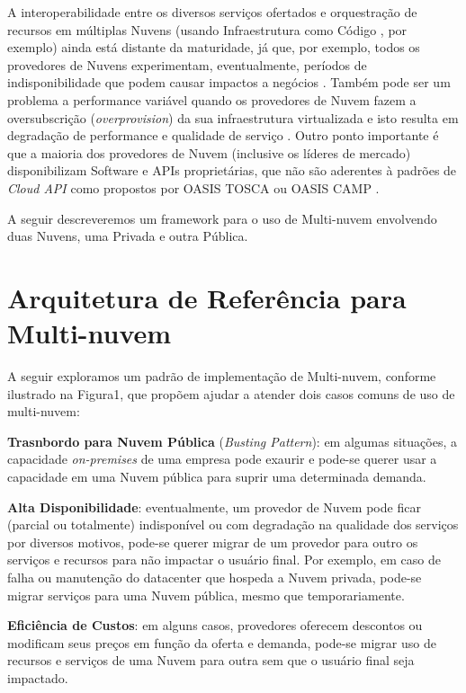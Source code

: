 \documentclass[12pt]{article}
\begin{document}
	A interoperabilidade entre os diversos serviços ofertados e orquestração de recursos em múltiplas Nuvens (usando Infraestrutura como Código \cite{Morris:2016}, por exemplo) ainda está distante da maturidade, já que, por exemplo, todos os provedores de Nuvens experimentam, eventualmente, períodos de indisponibilidade que podem causar impactos a negócios \cite{Fisher:2018}. Também pode ser um problema a performance variável quando os provedores de Nuvem fazem a oversubscrição (\textit{overprovision}) da sua infraestrutura virtualizada e isto resulta em degradação de performance e qualidade de serviço \cite{CloudSpectator:2017}. Outro ponto importante é que a maioria dos provedores de Nuvem  (inclusive os líderes de mercado) disponibilizam Software e APIs proprietárias, que não são aderentes à padrões de \textit{Cloud API} como propostos por OASIS TOSCA \cite{TOSCA:2019} ou OASIS CAMP \cite{CAMP:2019}.
	 
	A seguir descreveremos um framework para o uso de Multi-nuvem envolvendo duas Nuvens, uma Privada e outra Pública. 
	
	\section{Arquitetura de Referência para Multi-nuvem}
	
	A seguir exploramos um padrão de implementação de Multi-nuvem, conforme ilustrado na Figura1, que propõem ajudar a atender dois casos comuns de uso de multi-nuvem:
	
	\textbf{Trasnbordo para Nuvem Pública} (\textit{Busting Pattern}): em algumas situações, a capacidade \textit{on-premises} de uma empresa pode exaurir e pode-se querer usar a capacidade em uma Nuvem pública para suprir uma determinada demanda.
	
	\textbf{Alta Disponibilidade}: eventualmente, um provedor de Nuvem pode ficar (parcial ou totalmente) indisponível ou com degradação na qualidade dos serviços por diversos motivos, pode-se querer migrar de um provedor para outro os serviços e recursos para não impactar o usuário final. Por exemplo, em caso de falha ou manutenção do datacenter que hospeda a Nuvem privada, pode-se migrar serviços para uma Nuvem pública, mesmo que temporariamente.
	   
	\textbf{Eficiência de Custos}: em alguns casos, provedores oferecem descontos ou modificam seus preços em função da oferta e demanda, pode-se migrar uso de recursos e serviços de uma Nuvem para outra sem que o usuário final seja impactado.
	
\end{document}

